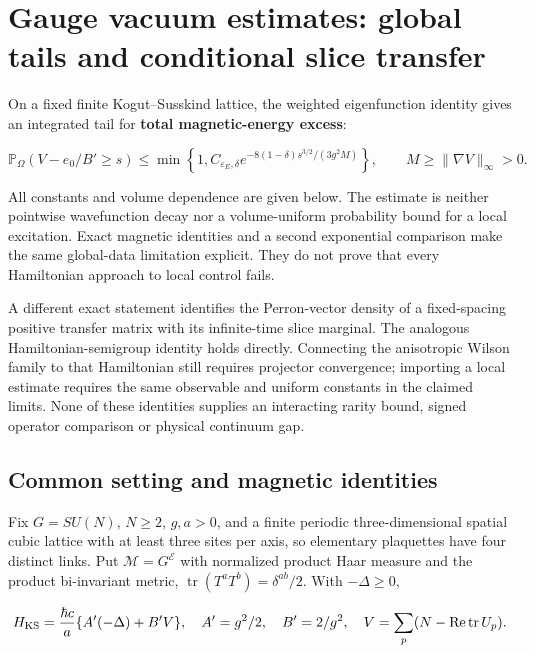 \documentclass[11pt,a4paper]{article}
\begin{document}
\hypertarget{gauge-vacuum-estimates-global-tails-and-conditional-slice-transfer}{%
\section{Gauge vacuum estimates: global tails and conditional slice
transfer}\label{gauge-vacuum-estimates-global-tails-and-conditional-slice-transfer}}

On a fixed finite Kogut--Susskind lattice, the weighted eigenfunction
identity gives an integrated tail for \textbf{total magnetic-energy
excess}:

\[\mathbb P_\Omega(V-e_0/B'\ge s)
 \le\min\left\{1,C_{\varepsilon_E,\delta}
 e^{-8(1-\delta)s^{3/2}/(3g^2M)}\right\},\qquad
 M\ge\|\nabla V\|_\infty>0.\]

All constants and volume dependence are given below. The estimate is
neither pointwise wavefunction decay nor a volume-uniform probability
bound for a local excitation. Exact magnetic identities and a second
exponential comparison make the same global-data limitation explicit.
They do not prove that every Hamiltonian approach to local control
fails.

A different exact statement identifies the Perron-vector density of a
fixed-spacing positive transfer matrix with its infinite-time slice
marginal. The analogous Hamiltonian-semigroup identity holds directly.
Connecting the anisotropic Wilson family to that Hamiltonian still
requires projector convergence; importing a local estimate requires the
same observable and uniform constants in the claimed limits. None of
these identities supplies an interacting rarity bound, signed operator
comparison or physical continuum gap.

\hypertarget{common-setting-and-magnetic-identities}{%
\subsection{Common setting and magnetic
identities}\label{common-setting-and-magnetic-identities}}

Fix \(G=SU(N)\), \(N\ge2\), \(g,a>0\), and a finite periodic
three-dimensional spatial cubic lattice with at least three sites per
axis, so elementary plaquettes have four distinct links. Put
\(\mathcal M=G^{\mathcal E}\) with normalized product Haar measure and
the product bi-invariant metric,
\(\operatorname{tr}(T^aT^b)=\delta^{ab}/2\). With \(-\Delta\ge0\),

\[H_{\rm KS}=\frac{\hbar c}{a}\{A'(-\Delta)+B'V\},\quad
 A'=g^2/2,\quad B'=2/g^2,\quad
 V=\sum_p(N-\operatorname{Re}\operatorname{tr}U_p).\]
\end{document}
